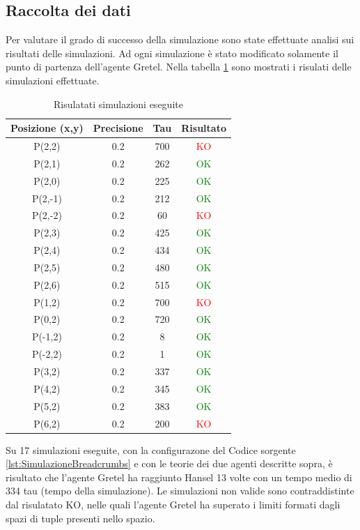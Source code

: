 \documentclass[12pt,a4paper,openright,twoside]{report}
\begin{document}
\subsection{Raccolta dei dati}
Per valutare il grado di successo della simulazione sono state effettuate analisi sui risultati delle simulazioni. Ad ogni simulazione \`e stato modificato solamente il punto di partenza dell'agente Gretel. Nella tabella \ref{RisultatiSimulazioni} sono mostrati i risulati delle simulazioni effettuate.
\\
\begin{table}[h!]
   \centering
   \begin{tabular}{||c c c c||}
      \hline
      Posizione (x,y) & Precisione & Tau & Risultato \\ [0.5ex]
      \hline\hline
      P(2,2) & 0.2 & 700 & \textcolor{red}{KO} \\
      \hline
      P(2,1) & 0.2 & 262 & \textcolor{green}{OK} \\
      \hline
      P(2,0) & 0.2 & 225 & \textcolor{green}{OK} \\
      \hline
      P(2,-1) & 0.2 & 212 & \textcolor{green}{OK} \\
      \hline
      P(2,-2) & 0.2 & 60 & \textcolor{red}{KO} \\
      \hline
      P(2,3) & 0.2 & 425 & \textcolor{green}{OK} \\
      \hline
      P(2,4) & 0.2 & 434 & \textcolor{green}{OK} \\
      \hline
      P(2,5) & 0.2 & 480 & \textcolor{green}{OK} \\
      \hline
      P(2,6) & 0.2 & 515 & \textcolor{green}{OK} \\
      \hline
      P(1,2) & 0.2 & 700 & \textcolor{red}{KO} \\
      \hline
      P(0,2) & 0.2 & 720 & \textcolor{green}{OK} \\
      \hline
      P(-1,2) & 0.2 & 8 & \textcolor{green}{OK} \\
      \hline
      P(-2,2) & 0.2 & 1 & \textcolor{green}{OK} \\
      \hline
      P(3,2) & 0.2 & 337 & \textcolor{green}{OK} \\
      \hline
      P(4,2) & 0.2 & 345 & \textcolor{green}{OK} \\
      \hline
      P(5,2) & 0.2 & 383 & \textcolor{green}{OK} \\
      \hline
      P(6,2) & 0.2 & 200 & \textcolor{red}{KO} \\
      \hline
   \end{tabular}
   \caption{Risulatati simulazioni eseguite}
   \label{RisultatiSimulazioni}
\end{table}
Su 17 simulazioni eseguite, con la configurazone del Codice sorgente \ref{lst:SimulazioneBreadcrumbs} e con le teorie dei due agenti descritte sopra, \`e risultato che l'agente Gretel ha raggiunto Hansel 13 volte con un tempo medio di 334 tau (tempo della simulazione).
Le simulazioni non valide sono contraddistinte dal risulatato KO, nelle quali l'agente Gretel ha superato i limiti formati dagli spazi di tuple presenti nello spazio.
\end{document}
